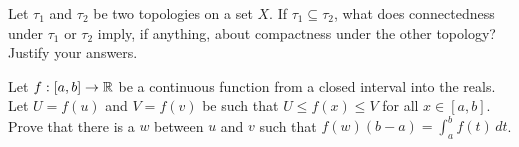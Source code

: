 Let $\tau_1$ and $\tau_2$ be two topologies on a set $X$. If $\tau_1 \subseteq \tau_2$, what does connectedness under $\tau_1$ or $\tau_2$ imply, if anything, about compactness under the other topology? Justify your answers.

\begin{comment}

\ExerciseSolution Let $A$ be a subset of $X$.  If $U$ and $V$ form a separation of $A$ in $(X, \tau_1)$, then $U$ and $V$ also form a separation of $A$ in $(X, \tau_2)$. So if $A$ is disconnected in $(X, \tau_1)$, then $A$ is disconnected in $(X, \tau_2)$. In other words, if $A$ is connected in $(X, \tau_2)$, then $A$ is connected in $(X, \tau_1)$. 

However, if $A$ is connected in $(X, \tau_1)$ it does not follow that $A$ is connected in $(X, \tau_2)$. For example, let $X = \R$ with $\tau_1$ the Euclidean metric topology and $\tau_2$ the discrete topology. We know that $A = (0,2)$ is connected in $(X, \tau_1)$. But $U = (0,1]$ and $V = (1,2)$ form a separation of $A$ in $(X, \tau_2)$ and so $A$ is not connected in $(X, \tau_2)$. 

\end{comment}


\item Let $f: [a,b] \to \mathbb{R}$ be a continuous function from a closed interval into the reals. Let $U = f(u)$ and $V = f(v)$ be such that $U \leq f(x) \leq V$ for all $x \in [a,b]$. Prove that there is a $w$ between $u$ and $v$ such that $f(w)(b-a) = \int_a^b f(t) \, dt$. 

\begin{comment}

\ExerciseSolution The Intermediate Value Theorem shows that for any value $t$ between $U$ and $V$ there is a number $s \in [a,b]$ such that $f(s) = t$. From calculus we know that $f(x) \leq V$ on $[a,b]$ implies that 
\[\int_a^b f(t) \, dt \leq \int_a^b V \, dt  = V(b-a)\]
and $U \leq f(x)$ on $[a,b]$ implies that 
\[\int_a^b f(t) \, dt \geq \int_a^b U \, dt  = U(b-a).\]
So 
\[U(b-a) \leq \int_a^b f(t) \, dt \leq V(b-a)\]
or
\[U \leq \frac{1}{b-a} \int_a^b f(t) \, dt \leq V.\]
Therefore, there exists $w \in [a,b]$ such that 
\[f(w) = \frac{1}{b-a} \int_a^b f(t) \, dt\]
or
\[f(w)(b-a) = \int_a^b f(t) \, dt.\]
You may recognize this result from calculus that the area between the graph of $f$ and the $x$-axis on $[a,b]$ can be realized as the area of a rectangle with height $f(w)$ and base $[a,b]$. The value $f(w)$ is the \emph{average value} of $f$ on $[a,b]$. 

\end{comment}

